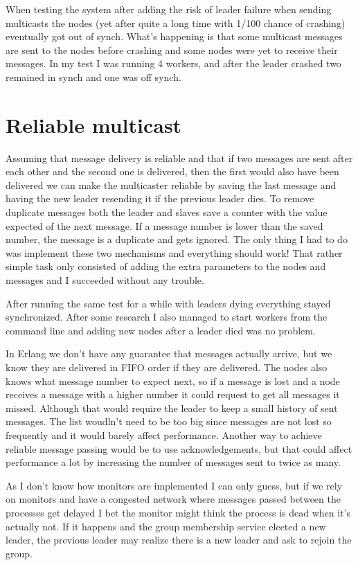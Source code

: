 \documentclass[a4paper, 11pt]{article}
\begin{document}
When testing the system after adding the risk of leader failure when sending multicasts the nodes (yet after quite a long time with 1/100 chance of crashing) eventually got out of synch. What's happening is that some multicast messages are sent to the nodes before crashing and some nodes were yet to receive their messages. In my test I was running 4 workers, and after the leader crashed two remained in synch and one was off synch. 

\section{Reliable multicast}

Assuming that message delivery is reliable and that if two messages are sent after each other and the second one is delivered, then the first would also have been delivered we can make the multicaster reliable by saving the last message and having the new leader resending it if the previous leader dies. To remove duplicate messages both the leader and slaves save a counter with the value expected of the next message. If a message number is lower than the saved number, the message is a duplicate and gets ignored. The only thing I had to do was implement these two mechanisms and everything should work! That rather simple task only consisted of adding the extra parameters to the nodes and messages and I succeeded without any trouble.

After running the same test for a while with leaders dying everything stayed synchronized. After some research I also managed to start workers from the command line and adding new nodes after a leader died was no problem. 

In Erlang we don't have any guarantee that messages actually arrive, but we know they are delivered in FIFO order if they are delivered. The nodes also knows what message number to expect next, so if a message is lost and a node receives a message with a higher number it could request to get all messages it missed. Although that would require the leader to keep a small history of sent messages. The list woudln't need to be too big since messages are not lost so frequently and it would barely affect performance. Another way to achieve reliable message passing would be to use acknowledgements, but that could affect performance a lot by increasing the number of messages sent to twice as many.

As I don't know how monitors are implemented I can only guess, but if we rely on monitors and have a congested network where messages passed between the processes get delayed I bet the monitor might think the process is dead when it's actually not. If it happens and the group membership service elected a new leader, the previous leader may realize there is a new leader and ask to rejoin the group.
\end{document}

